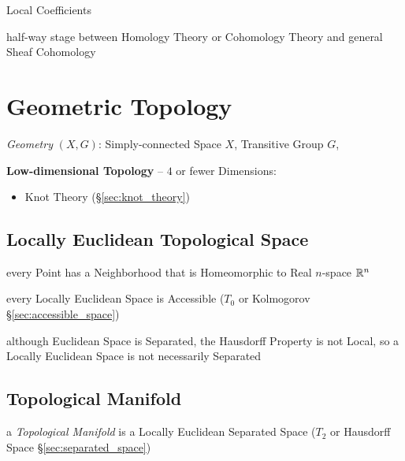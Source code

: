 Local Coefficients

half-way stage between Homology Theory or Cohomology Theory and general Sheaf
Cohomology



\section{Geometric Topology}\label{sec:geometric_topology}

\emph{Geometry} $(X,G)$: Simply-connected Space $X$, Transitive Group $G$,

\textbf{Low-dimensional Topology} -- $4$ or fewer Dimensions:
\begin{itemize}
  \item Knot Theory (\S\ref{sec:knot_theory})
\end{itemize}



\subsection{Locally Euclidean Topological Space}\label{sec:locally_euclidean}

every Point has a Neighborhood that is Homeomorphic to Real $n$-space $\mathbb{R}^n$

every Locally Euclidean Space is Accessible ($T_0$ or Kolmogorov
\S\ref{sec:accessible_space})

although Euclidean Space is Separated, the Hausdorff Property is not Local, so a
Locally Euclidean Space is not necessarily Separated



\subsection{Topological Manifold}\label{sec:topological_manifold}

a \emph{Topological Manifold} is a Locally Euclidean Separated Space ($T_2$ or
Hausdorff Space \S\ref{sec:separated_space})

